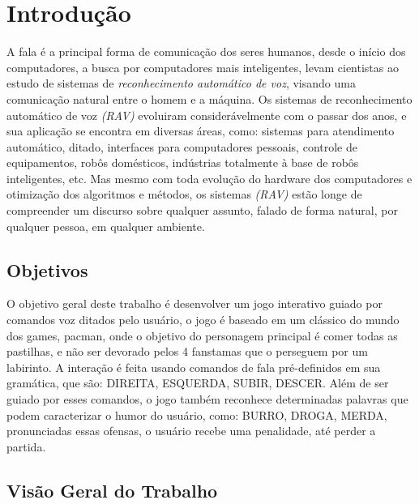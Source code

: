 \chapter{Introdução}

A fala é a principal forma de comunicação dos seres humanos, desde o início dos computadores, a busca por computadores mais inteligentes, levam cientistas ao estudo de sistemas de \textit {reconhecimento automático de voz}, visando uma comunicação natural entre o homem e a máquina. \cite{RavPtBr}
Os sistemas de reconhecimento automático de voz \textit{(RAV)} evoluiram considerávelmente com o passar dos anos, e 
sua aplicação se encontra em diversas áreas, como: sistemas para atendimento automático, ditado, interfaces para computadores pessoais, controle de equipamentos, robôs domésticos, indústrias totalmente à base de robôs inteligentes, etc. \cite{RavPtBr} Mas mesmo com toda evolução do hardware dos computadores e otimização dos algoritmos e métodos, os sistemas \textit{(RAV)} estão longe de compreender um discurso sobre qualquer assunto, falado de forma natural, por qualquer pessoa, em qualquer ambiente.\cite{RavIsoladas} 
   

\section{Objetivos}
O objetivo geral deste trabalho é desenvolver um jogo interativo guiado por comandos voz ditados pelo usuário, o jogo é baseado em um clássico do mundo dos games, pacman, onde o objetivo do personagem principal é comer todas as pastilhas, e não ser devorado pelos 4 fanstamas que o perseguem por um labirinto. A interação é feita usando comandos de fala pré-definidos em sua gramática, que são: DIREITA, ESQUERDA, SUBIR, DESCER. Além de ser guiado por esses comandos, o jogo também reconhece determinadas palavras que podem caracterizar o humor do usuário, como: BURRO, DROGA, MERDA, pronunciadas essas ofensas, o usuário recebe uma penalidade, até perder a partida. 

\section{Visão Geral do Trabalho}
